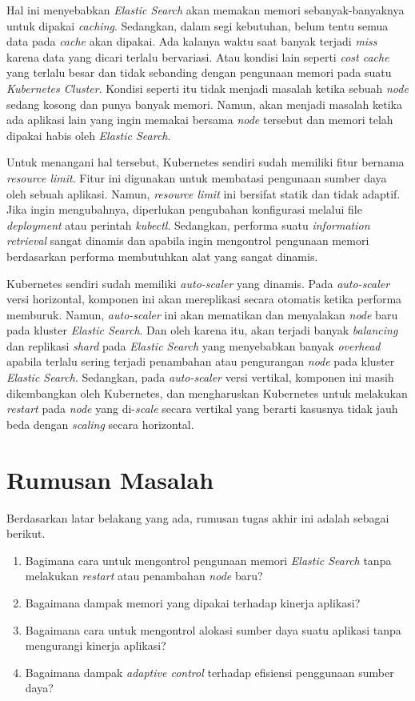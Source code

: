 Hal ini menyebabkan \textit{Elastic Search} akan memakan memori sebanyak-banyaknya untuk dipakai \textit{caching}. Sedangkan, dalam segi kebutuhan, belum tentu semua data pada \textit{cache} akan dipakai. Ada kalanya waktu saat banyak terjadi \textit{miss} karena data yang dicari terlalu bervariasi. Atau kondisi lain seperti \textit{cost cache} yang terlalu besar dan tidak sebanding dengan pengunaan memori pada suatu \textit{Kubernetes Cluster}. Kondisi seperti itu tidak menjadi masalah ketika sebuah \textit{node} sedang kosong dan punya banyak memori. Namun, akan menjadi masalah ketika ada aplikasi lain yang ingin memakai bersama \textit{node} tersebut dan memori telah dipakai habis oleh \textit{Elastic Search}.

Untuk menangani hal tersebut, Kubernetes sendiri sudah memiliki fitur bernama \textit{resource limit}. Fitur ini digunakan untuk membatasi pengunaan sumber daya oleh sebuah aplikasi. Namun, \textit{resource limit} ini bersifat statik dan tidak adaptif. Jika ingin mengubahnya, diperlukan pengubahan konfigurasi melalui file \textit{deployment} atau perintah \textit{kubectl}. Sedangkan, performa suatu \textit{information retrieval} sangat dinamis dan apabila ingin mengontrol pengunaan memori berdasarkan performa membutuhkan alat yang sangat dinamis.

Kubernetes sendiri sudah memiliki \textit{auto-scaler} yang dinamis. Pada \textit{auto-scaler} versi horizontal, komponen ini akan mereplikasi secara otomatis ketika performa memburuk. Namun, \textit{auto-scaler} ini akan mematikan dan menyalakan \textit{node} baru pada kluster \textit{Elastic Search}. Dan oleh karena itu, akan terjadi banyak \textit{balancing} dan replikasi \textit{shard} pada \textit{Elastic Search} yang menyebabkan banyak \textit{overhead} apabila terlalu sering terjadi penambahan atau pengurangan \textit{node} pada kluster \textit{Elastic Search}. Sedangkan, pada \textit{auto-scaler} versi vertikal, komponen ini masih dikembangkan oleh Kubernetes, dan mengharuskan Kubernetes untuk melakukan \textit{restart} pada \textit{node} yang di-\textit{scale} secara vertikal yang berarti kasusnya tidak jauh beda dengan \textit{scaling} secara horizontal.

\section{Rumusan Masalah}

Berdasarkan latar belakang yang ada, rumusan tugas akhir ini adalah sebagai berikut.
\begin{enumerate}
    \item Bagimana cara untuk mengontrol pengunaan memori \textit{Elastic Search} tanpa melakukan \textit{restart} atau penambahan \textit{node} baru?
    \item Bagaimana dampak memori yang dipakai terhadap kinerja aplikasi?
    \item Bagaimana cara untuk mengontrol alokasi sumber daya suatu aplikasi tanpa mengurangi kinerja aplikasi?
    \item Bagaimana dampak \textit{adaptive control} terhadap efisiensi penggunaan sumber daya?
\end{enumerate}

